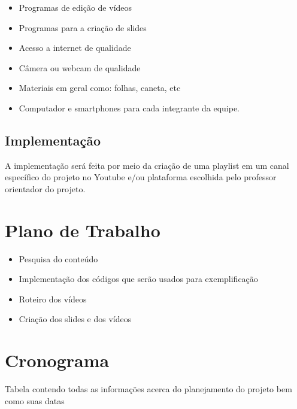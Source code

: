 \documentclass[a4paper,10pt]{article} %
\begin{document}
\begin{itemize}
 \item Programas de edição de vídeos 
 \item Programas para a criação de slides
 \item Acesso a internet de qualidade
 \item Câmera ou webcam de qualidade
 \item Materiais em geral como: folhas, caneta, etc
 \item Computador e smartphones para cada integrante da equipe.
\end{itemize}

\subsection{Implementação}
 A implementação será feita por meio da criação de uma playlist em um canal específico do projeto no Youtube e/ou plataforma escolhida pelo professor orientador do projeto.


\section{Plano de Trabalho}

 \begin{itemize}
  \item Pesquisa do conteúdo 
  \item Implementação dos códigos que serão usados para exemplificação
  \item Roteiro dos vídeos
  \item Criação dos slides e dos vídeos
\end{itemize}

\section{Cronograma}
Tabela contendo todas as informações acerca do planejamento do projeto bem como suas datas
\end{document}
